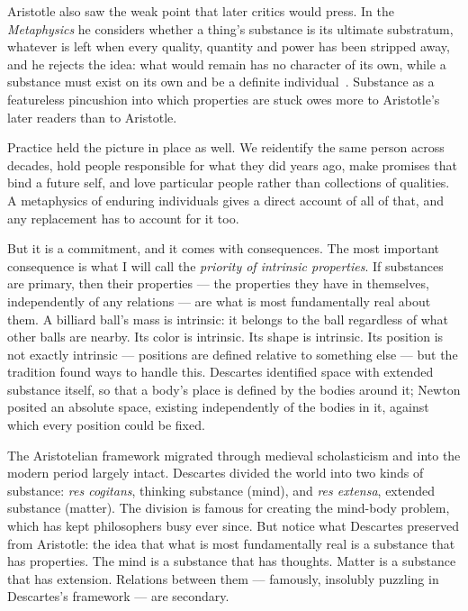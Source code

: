 Aristotle also saw the weak point that later critics would press. In the \textit{Metaphysics} he considers whether a thing's substance is its ultimate substratum, whatever is left when every quality, quantity and power has been stripped away, and he rejects the idea: what would remain has no character of its own, while a substance must exist on its own and be a definite individual~\citep[Book~VII, ch.~3]{Aristotle_Metaphysics}. Substance as a featureless pincushion into which properties are stuck owes more to Aristotle's later readers than to Aristotle.

Practice held the picture in place as well. We reidentify the same person across decades, hold people responsible for what they did years ago, make promises that bind a future self, and love particular people rather than collections of qualities. A metaphysics of enduring individuals gives a direct account of all of that, and any replacement has to account for it too.

But it is a commitment, and it comes with consequences. The most important consequence is what I will call the \emph{priority of intrinsic properties}. If substances are primary, then their properties --- the properties they have in themselves, independently of any relations --- are what is most fundamentally real about them. A billiard ball's mass is intrinsic: it belongs to the ball regardless of what other balls are nearby. Its color is intrinsic. Its shape is intrinsic. Its position is not exactly intrinsic --- positions are defined relative to something else --- but the tradition found ways to handle this. Descartes identified space with extended substance itself, so that a body's place is defined by the bodies around it; Newton posited an absolute space, existing independently of the bodies in it, against which every position could be fixed.

The Aristotelian framework migrated through medieval scholasticism and into the modern period largely intact. Descartes divided the world into two kinds of substance: \emph{res cogitans}, thinking substance (mind), and \emph{res extensa}, extended substance (matter). The division is famous for creating the mind-body problem, which has kept philosophers busy ever since. But notice what Descartes preserved from Aristotle: the idea that what is most fundamentally real is a substance that has properties. The mind is a substance that has thoughts. Matter is a substance that has extension. Relations between them --- famously, insolubly puzzling in Descartes's framework --- are secondary.

